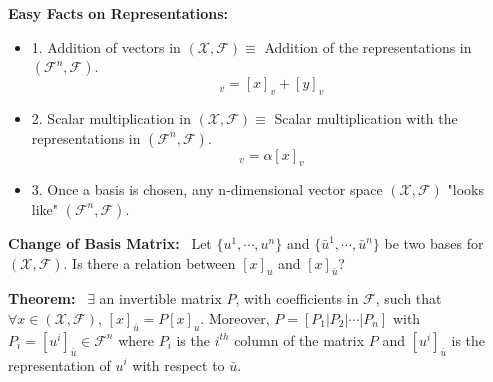\documentclass[letterpaper]{article}
\begin{document}
\baselineskip=48pt  %


\setlength{\parskip}{.3in}
\setlength{\itemsep}{.3in}

\pagestyle{plain}


\Large

\noindent \textbf{Easy Facts on Representations:}~
    \begin{itemize}
        \item[] 1. Addition of vectors in $(\mathcal{X},\mathcal{F}) \equiv$ Addition of the representations in $(\mathcal{F}^n,\mathcal{F})$.
        \begin{equation*}
            [x+y]_v=[x]_v+[y]_v
        \end{equation*}
        \item[] 2. Scalar multiplication in $(\mathcal{X},\mathcal{F}) \equiv$ Scalar multiplication with the representations in $(\mathcal{F}^n,\mathcal{F})$.
        \begin{equation*}
            [\alpha x]_v=\alpha[x]_v
        \end{equation*}
        \item[] 3. Once a basis is chosen, any n-dimensional vector space $(\mathcal{X},\mathcal{F})$ "looks like" $(\mathcal{F}^n,\mathcal{F})$.
    \end{itemize}
    
    \newpage

\textbf{Change of Basis Matrix:}~ Let $\{u^1, \dotsb, u^n\}$ and $\{\bar{u}^1, \dotsb, \bar{u}^n\}$ be two bases for $(\mathcal{X},\mathcal{F})$. Is there a relation between $[x]_u$ and $[x]_{\bar{u}}$?

\noindent \textbf{Theorem:}~ $\exists$ an invertible matrix $P$, with coefficients in $\mathcal{F}$, such that $\forall x\in(\mathcal{X},\mathcal{F})$, $[x]_{\bar{u}}=P[x]_u$.
    Moreover, $P=\left[P_1|P_2|\dotsb|P_n\right]$ with $P_i=[u^i]_{\bar{u}}\in\mathcal{F}^{n}$ where $P_i$ is the $i^{th}$ column of the matrix $P$ and $[u^i]_{\bar{u}}$ is the representation of $u^i$ with respect to $\bar{u}$.
\end{document}
